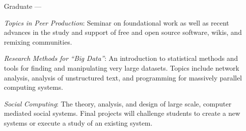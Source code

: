 \documentclass[10pt]{memoir}
\newenvironment{enumerate*}%
  {\begin{enumerate}%
    \setlength{\itemsep}{0pt}%
    \setlength{\parskip}{0pt}}%
  {\end{enumerate}}
\begin{document}
Graduate ---
\begin{enumerate*}
\item \emph{Topics in Peer Production}: Seminar on foundational work
  as well as recent advances in the study and support of free and open
  source software, wikis, and remixing communities.
\item \emph{Research Methods for ``Big Data''}: An introduction to
  statistical methods and tools for finding and manipulating very
  large datasets. Topics include network analysis, analysis of
  unstructured text, and programming for massively parallel computing
  systems.
\item \emph{Social Computing}: The theory, analysis, and design of
  large scale, computer mediated social systems. Final projects will
  challenge students to create a new systems or execute a study of an
  existing system.
\end{enumerate*}
\end{document}
